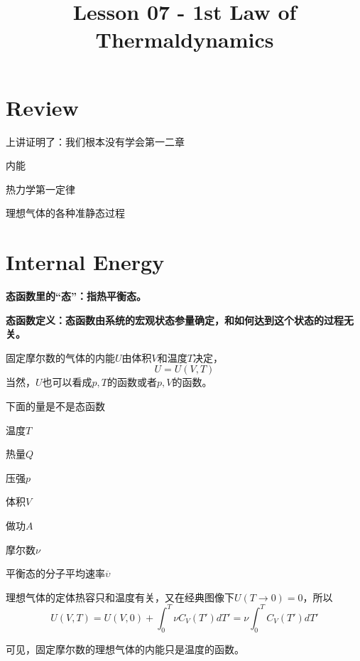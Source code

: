 \documentclass[CJK]{beamer}
\title{Lesson 07 - 1st Law of Thermaldynamics}
\author{}
\date{}
\begin{document}


\section{Review}

\begin{frame}
\bch
\bitem
\item{上讲证明了：我们根本没有学会第一二章}
\eitem
\ech
\end{frame}

\begin{frame}
\bch
\bitem
\item{内能}
\item{热力学第一定律}
\item{理想气体的各种准静态过程}
\eitem
\ech
\end{frame}


\section{Internal Energy}

\begin{frame}
\bch
\bitem
\item{\bf 态函数里的“态”：指热平衡态。}
\item{\bf 态函数定义：态函数由系统的宏观状态参量确定，和如何达到这个状态的过程无关。}
\eitem

\bex
固定摩尔数的气体的内能$U$由体积$V$和温度$T$决定，
$$ U  = U(V, T)$$
当然，$U$也可以看成$p, T$的函数或者$p, V$的函数。
\eex

\ech
\end{frame}

\begin{frame}
\bch
下面的量是不是态函数
\bitem
\item{温度$T$}
\item{热量$Q$}
\item{压强$p$}
\item{体积$V$}
\item{做功$A$}
\item{摩尔数$\nu$}
\item{平衡态的分子平均速率$\overline{\upsilon}$}
\eitem
\ech
\end{frame}

\begin{frame}
\bch
理想气体的定体热容只和温度有关，又在经典图像下$U(T\rightarrow 0) = 0$，所以
$$ U(V, T) = U(V, 0) + \int_0^T \nu C_V(T') dT' =\nu  \int_0^T C_V(T') dT'  $$

可见，固定摩尔数的理想气体的内能只是温度的函数。
\ech
\end{frame}
\end{document}
